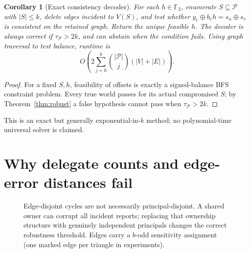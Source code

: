 \documentclass[10pt,a4paper]{article}
\newtheorem{corollary}[theorem]{Corollary}
\theoremstyle{definition}\newtheorem{definition}[theorem]{Definition}
\newcommand{\F}{\mathbb F_2}
\newcommand{\Princ}{\mathcal P}
\newcommand{\xor}{\mathbin{\oplus}}
\begin{document}
\begin{corollary}[Exact consistency decoder]\label{cor:decode}
For each $h\in\F$, enumerate $S\subseteq\Princ$ with $|S|\le k$, delete edges incident to $V(S)$, and test whether $y_e\xor b_eh=s_u\xor s_v$ is consistent on the retained graph. Return the unique feasible $h$. The decoder is always correct if $\tau_{\Princ}>2k$, and can abstain when the condition fails. Using graph traversal to test balance, runtime is
\[O\!\left(2\sum_{j=0}^k\binom{|\Princ|}{j}(|V|+|E|)\right).\]
\end{corollary}
\begin{proof}For a fixed $S,h$, feasibility of offsets is exactly a signed-balance BFS constraint problem. Every true world passes for its actual compromised $S$; by Theorem~\ref{thm:robust} a false hypothesis cannot pass when $\tau_{\Princ}>2k$.\end{proof}
This is an exact but generally exponential-in-$k$ method; no polynomial-time universal solver is claimed.

\section{Why delegate counts and edge-error distances fail}
\begin{figure}[h]
\centering
{}
\caption{Edge-disjoint cycles are not necessarily principal-disjoint. A shared owner can corrupt all incident reports; replacing that ownership structure with genuinely independent principals changes the correct robustness threshold. Edges carry a $b$-odd sensitivity assignment (one marked edge per triangle in experiments).}\label{fig:two}
\end{figure}
\end{document}
